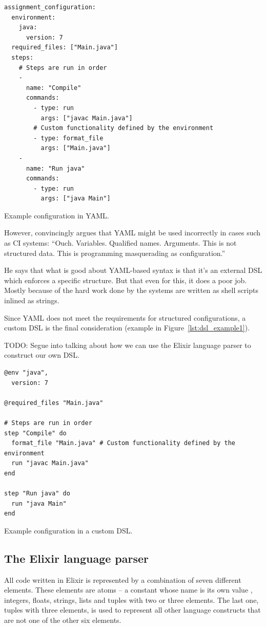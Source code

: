 \begin{listing}
\begin{verbatim}
assignment_configuration:
  environment:
    java:
      version: 7
  required_files: ["Main.java"]
  steps:
    # Steps are run in order
    - 
      name: "Compile"
      commands: 
        - type: run
          args: ["javac Main.java"]
        # Custom functionality defined by the environment
        - type: format_file
          args: ["Main.java"]
    -
      name: "Run java"
      commands: 
        - type: run
          args: ["java Main"]
\end{verbatim}
\caption{Example configuration in YAML.}
\label{lst:yaml_example}
\end{listing}

However, \cite{JohnsonInYAML} convincingly argues that YAML might be used incorrectly in cases such as CI systems: ``Ouch. Variables. Qualified names. Arguments. This is not structured data. This is programming masquerading as configuration.''

He says that what is good about YAML-based syntax is that it's an external DSL which enforces a specific structure. But that even for this, it does a poor job. Mostly because of the hard work done by the systems are written as shell scripts inlined as strings.

Since YAML does not meet the requirements for structured configurations, a custom DSL is the final consideration (example in Figure~\ref{lst:dsl_example1}). 

TODO: Segue into talking about how we can use the Elixir language parser to construct our own DSL.


\begin{listing}
\begin{verbatim}
@env "java",
  version: 7
  
@required_files "Main.java"

# Steps are run in order
step "Compile" do
  format_file "Main.java" # Custom functionality defined by the environment
  run "javac Main.java"
end

step "Run java" do
  run "java Main"
end
\end{verbatim}
\caption{Example configuration in a custom DSL.}
\label{lst:dsl_example1}
\end{listing}

\subsection{The Elixir language parser}
All code written in Elixir is represented by a combination of seven different elements. These elements are atoms -- a constant whose name is its own value \citep{2019BasicElixir}, integers, floats, strings, lists and tuples with two or three elements. The last one, tuples with three elements, is used to represent all other language constructs that are not one of the other six elements.


